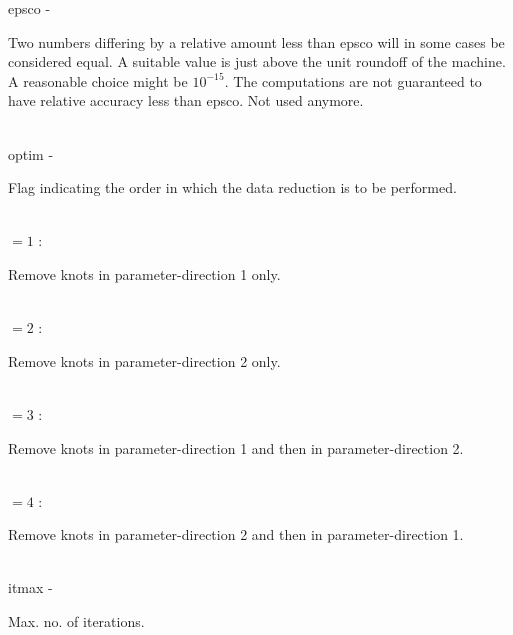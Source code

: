         \>\>    {\fov epsco}\> - \>             \begin{minipg2}
                                Two numbers differing by a relative amount less than
                                epsco will in some cases be considered equal. A suitable
                                value is just above the unit roundoff of the machine.
                                A reasonable choice might be $10^{-15}$. The
                                computations are not guaranteed to have relative
                                accuracy less than epsco.
                                Not used anymore.
                                \end{minipg2} \\[0.3ex]
        \>\>    {\fov optim}\> - \>             \begin{minipg2}
                                Flag indicating the order in which the data
                                reduction is to be performed.
                                \end{minipg2}\\[0.3ex]
                \>\>\>\>\>      $= 1$ :\>\begin{minipg5}
                                Remove knots in parameter-direction 1 only.
                                \end{minipg5}\\[0.3ex]
                \>\>\>\>\>      $= 2$ : \>\begin{minipg5}
                                Remove knots in parameter-direction 2 only.
                                \end{minipg5}\\[0.3ex]
                \>\>\>\>\>      $= 3$ : \>\begin{minipg5}
                                        Remove knots in parameter-direction 1
                                                and then in parameter-direction 2.
                                \end{minipg5}\\[0.3ex]
                \>\>\>\>\>      $= 4$ : \>\begin{minipg5}
                                        Remove knots in parameter-direction 2
                                                and then in parameter-direction 1.
                                \end{minipg5}\\[0.3ex]
        \>\>    {\fov itmax}\> - \>     \begin{minipg2}
                                Max. no. of iterations.
                                \end{minipg2}\\
